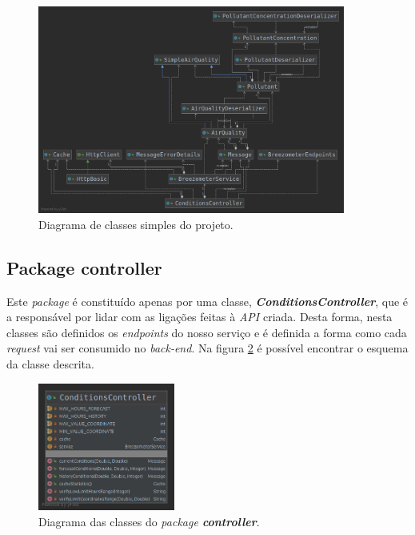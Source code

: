 \begin{figure}[h]
   \centering
   \includegraphics[width=0.90\textwidth]{images/simple_diagram}
   \caption{Diagrama de classes simples do projeto.}
   \label{fig:simple_diagram}
\end{figure}


\subsection{Package controller}
Este \textit{package} é constituído apenas por uma classe, \textbf{\textit{ConditionsController}}, que é
a responsável por lidar com as ligações feitas à \textit{API} criada. Desta forma, nesta classes são
definidos os \textit{endpoints} do nosso serviço e é definida a forma como cada \textit{request} vai ser
consumido no \textit{back-end}. Na figura \ref{fig:controller_diagram} é possível encontrar o esquema da
classe descrita.

\begin{figure}[h]
   \centering
   \includegraphics[width=0.40\textwidth]{images/controller_diagram}
   \caption{Diagrama das classes do \textit{package \textbf{controller}}.}
   \label{fig:controller_diagram}
\end{figure}


